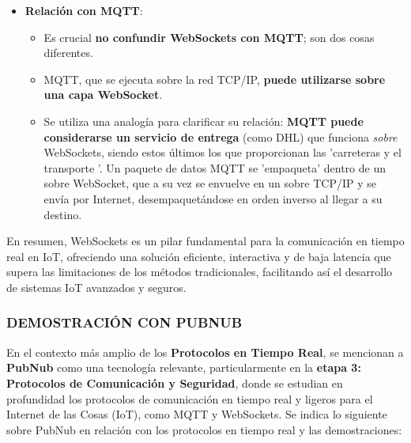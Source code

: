 \documentclass{report}
\begin{document}
\begin{itemize}
    \item \textbf{Relación con MQTT}:
    \begin{itemize}
        \item Es crucial \textbf{no confundir WebSockets con MQTT}; son dos cosas diferentes.
        \item MQTT, que se ejecuta sobre la red TCP/IP, \textbf{puede utilizarse sobre una capa WebSocket}.
        \item Se utiliza una analogía para clarificar su relación: \textbf{MQTT puede considerarse un servicio de entrega} (como DHL) que funciona 
        \textit{sobre} WebSockets, siendo estos últimos los que proporcionan las  'carreteras y el transporte '. Un paquete de datos MQTT se  'empaqueta' 
        dentro de un sobre WebSocket, que a su vez se envuelve en un sobre TCP/IP y se envía por Internet, desempaquetándose en orden inverso al llegar 
        a su destino.
    \end{itemize}
\end{itemize}
En resumen, WebSockets es un pilar fundamental para la comunicación en tiempo real en IoT, ofreciendo una solución eficiente, interactiva y de baja 
latencia que supera las limitaciones de los métodos tradicionales, facilitando así el desarrollo de sistemas IoT avanzados y seguros.

\subsubsection{DEMOSTRACIÓN CON PUBNUB}
En el contexto más amplio de los \textbf{Protocolos en Tiempo Real}, se  mencionan a \textbf{PubNub} como una tecnología relevante, particularmente 
en la \textbf{etapa 3: Protocolos de Comunicación y Seguridad}, donde se estudian en profundidad los protocolos de comunicación en tiempo real y ligeros 
para el Internet de las Cosas (IoT), como MQTT y WebSockets. Se indica lo siguiente sobre PubNub en relación con los protocolos en tiempo real 
y las demostraciones:
\end{document}
